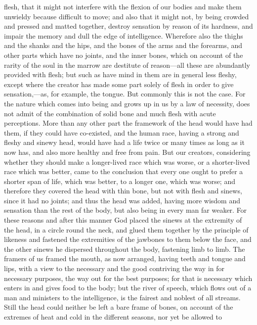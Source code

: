 flesh, that it might not interfere with the flexion of our bodies and make
them unwieldy because difficult to move; and also that it might not, by
being crowded and pressed and matted together, destroy sensation by reason
of its hardness, and impair the memory and dull the edge of intelligence.
Wherefore also the thighs and the shanks and the hips, and the bones of
the arms and the forearms, and other parts which have no joints, and the
inner bones, which on account of the rarity of the soul in the marrow are
destitute of reason—all these are abundantly provided with flesh;
but such as have mind in them are in general less fleshy, except where the
creator has made some part solely of flesh in order to give sensation,—as,
for example, the tongue. But commonly this is not the case. For the nature
which comes into being and grows up in us by a law of necessity, does not
admit of the combination of solid bone and much flesh with acute
perceptions. More than any other part the framework of the head would have
had them, if they could have co-existed, and the human race, having a
strong and fleshy and sinewy head, would have had a life twice or many
times as long as it now has, and also more healthy and free from pain. But
our creators, considering whether they should make a longer-lived race
which was worse, or a shorter-lived race which was better, came to the
conclusion that every one ought to prefer a shorter span of life, which
was better, to a longer one, which was worse; and therefore they covered
the head with thin bone, but not with flesh and sinews, since it had no
joints; and thus the head was added, having more wisdom and sensation than
the rest of the body, but also being in every man far weaker. For these
reasons and after this manner God placed the sinews at the extremity of
the head, in a circle round the neck, and glued them together by the
principle of likeness and fastened the extremities of the jawbones to them
below the face, and the other sinews he dispersed throughout the body,
fastening limb to limb. The framers of us framed the mouth, as now
arranged, having teeth and tongue and lips, with a view to the necessary
and the good contriving the way in for necessary purposes, the way out for
the best purposes; for that is necessary which enters in and gives food to
the body; but the river of speech, which flows out of a man and ministers
to the intelligence, is the fairest and noblest of all streams. Still the
head could neither be left a bare frame of bones, on account of the
extremes of heat and cold in the different seasons, nor yet be allowed to
